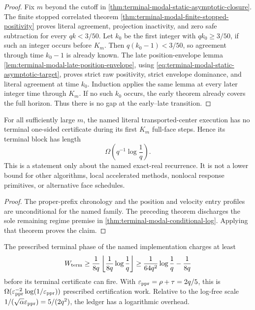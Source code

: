 \begin{proof}
Fix $m$ beyond the cutoff in
\cref{thm:terminal-modal-static-asymptotic-closure}.  The finite stopped
correlated theorem
\cref{thm:terminal-modal-finite-stopped-positivity} proves literal agreement,
projection inactivity, and zero safe subtraction for every $qk<3/50$.
Let $k_0$ be the first integer with $qk_0\ge3/50$, if such an integer occurs
before $K_m$.  Then $q(k_0-1)<3/50$, so agreement through time $k_0-1$ is
already known.  The late position-envelope lemma
\cref{lem:terminal-modal-late-position-envelope}, using
\eqref{eq:terminal-modal-static-asymptotic-target}, proves strict raw
positivity, strict envelope dominance, and literal agreement at time $k_0$.
Induction applies the same lemma at every later integer time through $K_m$.
If no such $k_0$ occurs, the early theorem already covers the full horizon.
Thus there is no gap at the early--late transition.
\end{proof}

\begin{theorem}
\label{thm:terminal-modal-log-unconditional}
For all sufficiently large $m$, the named literal transported-center
execution has no terminal one-sided certificate during its first $K_m$
full-face steps.  Hence its terminal block has length
\begin{equation}
 \Omega\!\left(q^{-1}\log\frac1q\right).
 \label{eq:terminal-modal-log-unconditional}
\end{equation}
This is a statement only about the named exact-real recurrence.  It is not a
lower bound for other algorithms, local accelerated methods, nonlocal
response primitives, or alternative face schedules.
\end{theorem}

\begin{proof}
The proper-prefix chronology and the position and velocity entry profiles
are unconditional for the named family.  The preceding theorem discharges
the sole remaining regime premise in
\cref{thm:terminal-modal-conditional-log}.  Applying that theorem proves the
claim.
\end{proof}

\begin{corollary}
\label{cor:terminal-modal-charged-work}
The prescribed terminal phase of the named implementation charges at least
\begin{equation}
 W_{\rm term}
 \ge \frac1{8q}\left\lfloor\frac1{8q}\log\frac1q\right\rfloor
 \ge \frac1{64q^2}\log\frac1q-\frac1{8q}
 \label{eq:terminal-modal-charged-work}
\end{equation}
before its terminal certificate can fire.  With
$\varepsilon_{\mathrm{ppr}}=\rho+\tau=2q/5$, this is
$\Omega(\varepsilon_{\mathrm{ppr}}^{-2}\log(1/\varepsilon_{\mathrm{ppr}}))$ prescribed certification work.
Relative to the log-free scale
$1/(\sqrt\alpha\varepsilon_{\mathrm{ppr}})=5/(2q^2)$, the ledger has a logarithmic overhead.
\end{corollary}

